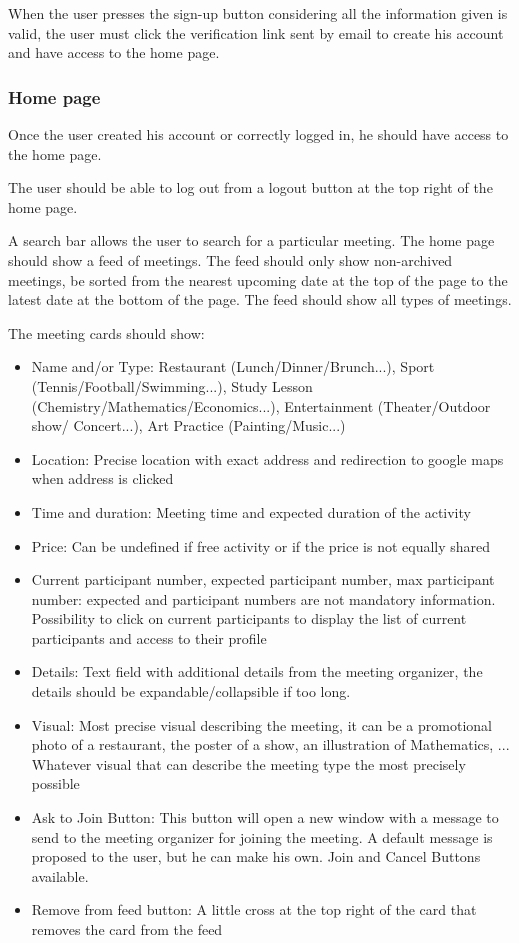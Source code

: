 \documentclass[conference]{IEEEtran}
\begin{document}
When the user presses the sign-up button considering all
the information given is valid, the user must click the verification link sent by email to create his account and have access to the home page.

\subsubsection{Home page}

Once the user created his account or correctly logged in, he should have access to the home page.

The user should be able to log out from a logout button at the top right of the home page.

A search bar allows the user to search for a particular meeting.
The home page should show a feed of meetings. The feed should only show non-archived meetings, be sorted from the nearest upcoming date at the top of the page to the latest date at the bottom of the page. The feed should show all types of meetings.

The meeting cards should show:

\begin{itemize}
\item Name and/or Type: Restaurant
(Lunch/Dinner/Brunch...), Sport (Tennis/Football/Swimming...), Study Lesson (Chemistry/Mathematics/Economics...), Entertainment (Theater/Outdoor show/ Concert...), Art Practice (Painting/Music...)
\item Location: Precise location with exact address and redirection to google maps when address is clicked
\item Time and duration: Meeting time and expected duration
of the activity
\item Price: Can be undefined if free activity or if the price is
not equally shared
\item Current participant number, expected participant
number, max participant number: expected and participant numbers are not mandatory information.
Possibility to click on current participants to display the
list of current participants and access to their profile
\item Details: Text field with additional details from the meeting organizer, the details should be
expandable/collapsible if too long.
\item Visual: Most precise visual describing the meeting, it can
be a promotional photo of a restaurant, the poster of a show, an illustration of Mathematics, ... Whatever visual that can describe the meeting type the most precisely possible
\item Ask to Join Button: This button will open a new window with a message to send to the meeting organizer for joining the meeting. A default message is proposed to the user, but he can make his own. Join and Cancel Buttons available.
\item Remove from feed button: A little cross at the top right of the card that removes the card from the feed
\end{itemize}
\end{document}
